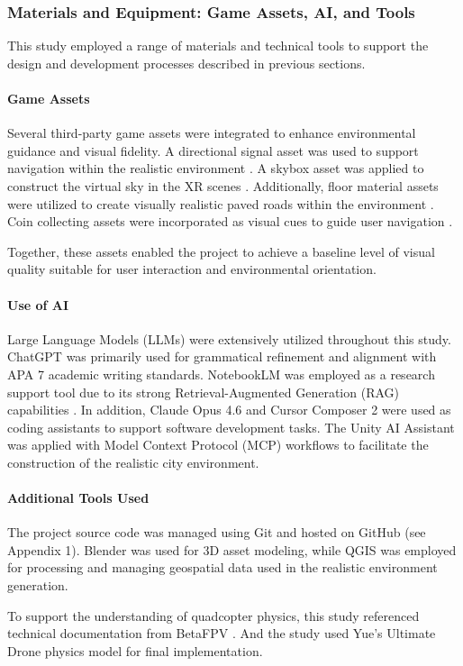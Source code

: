 \subsubsection{Materials and Equipment: Game Assets, AI, and Tools}

This study employed a range of materials and technical tools to support the design and development processes described in previous sections.

\paragraph{Game Assets}

Several third-party game assets were integrated to enhance environmental guidance and visual fidelity. A directional signal asset was used to support navigation within the realistic environment \parencite{unity_env_track_lowpoly}. A skybox asset was applied to construct the virtual sky in the XR scenes \parencite{unity_fantasy_skybox}. Additionally, floor material assets were utilized to create visually realistic paved roads within the environment \parencite{unity_floor_materials}. Coin collecting assets were incorporated as visual cues to guide user navigation \parencite{unity_gems_items}.

Together, these assets enabled the project to achieve a baseline level of visual quality suitable for user interaction and environmental orientation.

\paragraph{Use of AI}

Large Language Models (LLMs) were extensively utilized throughout this study. ChatGPT was primarily used for grammatical refinement and alignment with APA 7 academic writing standards. NotebookLM was employed as a research support tool due to its strong Retrieval-Augmented Generation (RAG) capabilities \parencite{maniulit_learning_2026}. In addition, Claude Opus 4.6 and Cursor Composer 2 were used as coding assistants to support software development tasks. The Unity AI Assistant was applied with Model Context Protocol (MCP) workflows to facilitate the construction of the realistic city environment.

\paragraph{Additional Tools Used}

The project source code was managed using Git and hosted on GitHub (see Appendix 1). Blender was used for 3D asset modeling, while QGIS was employed for processing and managing geospatial data used in the realistic environment generation.

To support the understanding of quadcopter physics, this study referenced technical documentation from BetaFPV \parencite{betafpv2022manual}. And the study used Yue's Ultimate Drone physics model \parencite{yuetility2022fpvphysics} for final implementation.